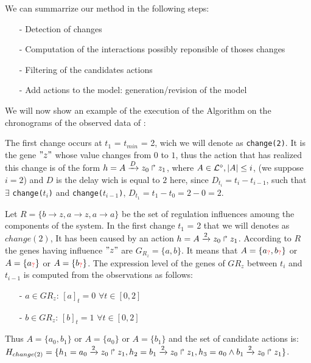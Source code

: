 We can summarrize our method in the following steps:
\begin{itemize}
\item[-] Detection of changes
\item[-] Computation of the interactions possibly reponsible of thoses changes
\item[-] Filtering of the candidates actions
\item[-] Add actions to the model: generation/revision of the model
\end{itemize}


We will now show an example of the execution of the Algorithm  on the chronograms of the observed data of :


The first change occurs at $t_1$ = $t_{min}$ = 2,
wich we will denote as \texttt{change(2)}. It is the gene $"z"$ whose value changes from $0$ to $1$, thus the action that has realized this change is of the form $h = A\xrightarrow{D} z_0 \Rsh z_1$,
where $ A \in \mathcal{L}^{\diamond}, | A| \leq i$, (we suppose $i=2$) and $D$ is the delay wich is equal to $2$ here, since
$D_{t_i}=t_i - t_{i-1}$, such that $\exists$ \texttt{change($t_i$)} and \texttt{change($t_{i-1}$)},
$D_{t_1}= t_1 - t_0 = 2 - 0 = 2$.

Let $R=\{ b \rightarrow z, a \rightarrow z, a \rightarrow a \}$
be the set of regulation influences amoung the components of the system.
%
In the first change $t_1$ = 2 that we will denotes as $change(2)$,
It has been caused by an action $h = A\xrightarrow{2} z_0 \Rsh z_1$. According to $R$ the genes having influence $"z"$ are $G_{R_z} = \{a, b\}$. It means that $A= \{ a_{\textcolor{red}{?}}, b_{\textcolor{red}{?}} \} $ or $A= \{ a_{\textcolor{red}{?}} \} $ or $A= \{ b_{\textcolor{red}{?}} \} $.
%
The expression level of the genes of $G{R_z}$ between $t_i$ and $t_{i-1}$ is computed from the observations as follows:
\begin{itemize}
\item[-] $a \in  G{R_z}$: $[a]_t=0$ $\forall t \in [0,2] $
\item[-] $b \in  G{R_z}$: $[b]_t=1$ $\forall t \in [0,2] $
\end{itemize}
%
Thus $A= \{ a_0, b_1 \} $ or $A= \{ a_0\} $ or $A= \{ b_1 \} $ and the set of candidate actions is:
$H_{change(2)} = \{ h_1=a_0\xrightarrow{2} z_0 \Rsh z_1
, h_2=b_1\xrightarrow{2} z_0 \Rsh z_1
, h_3=a_0 \wedge b_1 \xrightarrow{2} z_0 \Rsh z_1 \}$.

